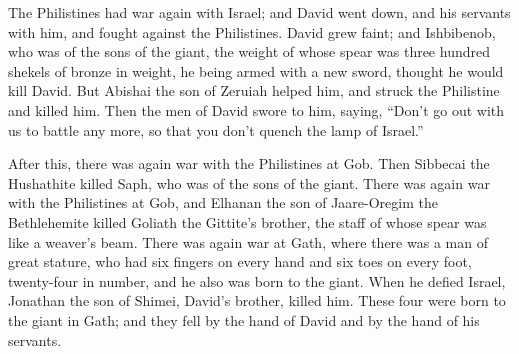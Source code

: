 \myverse{}The Philistines had war again with Israel; and David went down,
and his servants with him, and fought against the Philistines. David grew faint;
\myverse{}and Ishbibenob, who was of the sons of the giant, the weight of whose spear
was three hundred shekels of bronze in weight, he being armed with a new sword, thought he would kill
David.
\myverse{}But Abishai the son of Zeruiah helped him, and struck the Philistine and
killed him. Then the men of David swore to him, saying, “Don’t go out with us to battle any more, so that
you don’t quench the lamp of Israel.”

\myverse{}After this, there was again war with the Philistines at Gob.
Then Sibbecai the Hushathite killed Saph, who was of the sons of the giant.
\myverse{}There was again war with the Philistines at Gob, and Elhanan the son of Jaare-Oregim
the Bethlehemite killed Goliath the Gittite’s brother, the staff of whose spear was like a weaver’s beam.
\myverse{}There was again war at Gath, where there was a man of great stature, who
had six fingers on every hand and six toes on every foot, twenty-four in number, and he also was born
to the giant.
\myverse{}When he defied Israel, Jonathan the son of Shimei, David’s brother, killed
him.
\myverse{}These four were born to the giant in Gath; and they fell by the hand of David
and by the hand of his servants.


